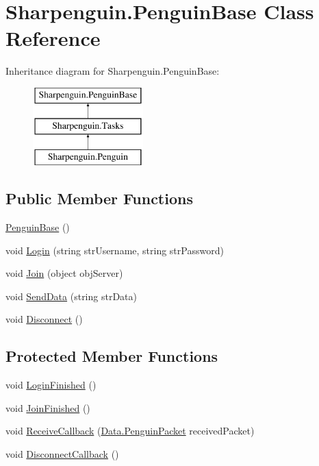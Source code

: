 \hypertarget{classSharpenguin_1_1PenguinBase}{\section{Sharpenguin.\-Penguin\-Base Class Reference}
\label{classSharpenguin_1_1PenguinBase}
}
Inheritance diagram for Sharpenguin.\-Penguin\-Base\-:\begin{figure}[H]
\begin{center}
\leavevmode
\includegraphics[height=3.000000cm]{classSharpenguin_1_1PenguinBase}
\end{center}
\end{figure}
\subsection*{Public Member Functions}
\begin{DoxyCompactItemize}
\item 
\hyperlink{classSharpenguin_1_1PenguinBase_abae69c0be10d8de6f6f852a5a9820c44}{Penguin\-Base} ()
\item 
void \hyperlink{classSharpenguin_1_1PenguinBase_a339081cc6d7b689525639e9c41275d53}{Login} (string str\-Username, string str\-Password)
\item 
void \hyperlink{classSharpenguin_1_1PenguinBase_ae883a098b18a513c9ca47e80d833c32e}{Join} (object obj\-Server)
\item 
void \hyperlink{classSharpenguin_1_1PenguinBase_a50ba7c1e17673282b539e280c4552773}{Send\-Data} (string str\-Data)
\item 
void \hyperlink{classSharpenguin_1_1PenguinBase_a1c56da96688962cc6db870fad34b9e62}{Disconnect} ()
\end{DoxyCompactItemize}
\subsection*{Protected Member Functions}
\begin{DoxyCompactItemize}
\item 
void \hyperlink{classSharpenguin_1_1PenguinBase_aa6a126810f26f0b1d85b8c6e35eed5c9}{Login\-Finished} ()
\item 
void \hyperlink{classSharpenguin_1_1PenguinBase_a64a4a3cd550fd49156f9ed5fbd1836ed}{Join\-Finished} ()
\item 
void \hyperlink{classSharpenguin_1_1PenguinBase_a0d866e6fe167c36721fc282cb36d9d07}{Receive\-Callback} (\hyperlink{classSharpenguin_1_1Data_1_1PenguinPacket}{Data.\-Penguin\-Packet} received\-Packet)
\item 
void \hyperlink{classSharpenguin_1_1PenguinBase_a06facd0f0f753fa79596ae31a6811a86}{Disconnect\-Callback} ()
\end{DoxyCompactItemize}
